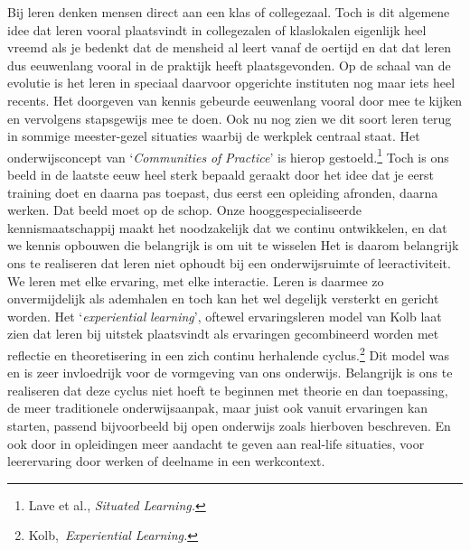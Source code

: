 \documentclass[smallauthor, chapterhaspagenum, nochapterinheader, pagenuminheader,  bigchapnum,medium2, tocpages, garamond, titleinheader]{jote-book}
\begin{document}
	Bij leren denken mensen direct aan een klas of collegezaal. Toch is dit algemene idee dat leren vooral plaatsvindt in collegezalen of klaslokalen eigenlijk heel vreemd als je bedenkt dat de mensheid al leert vanaf de oertijd en dat dat leren dus eeuwenlang vooral in de praktijk heeft plaatsgevonden. Op de schaal van de evolutie is het leren in speciaal daarvoor opgerichte instituten nog maar iets heel recents. Het doorgeven van kennis gebeurde eeuwenlang vooral door mee te kijken en vervolgens stapsgewijs mee te doen. Ook nu nog zien we dit soort leren terug in sommige meester-gezel situaties waarbij de werkplek centraal staat. Het onderwijsconcept van ‘\emph{Communities}\emph{ of }\emph{Practice}' is hierop gestoeld.\footnote{Lave et al.,\emph{ }\emph{Situated}\emph{ Learning}\emph{.}} Toch is ons beeld in de laatste eeuw heel sterk bepaald geraakt door het idee dat je eerst training doet en daarna pas toepast, dus eerst een opleiding afronden, daarna werken. Dat beeld moet op de schop. Onze hooggespecialiseerde kennismaatschappij maakt het noodzakelijk dat we continu ontwikkelen, en dat we kennis opbouwen die belangrijk is om uit te wisselen Het is daarom belangrijk ons te realiseren dat leren niet ophoudt bij een onderwijsruimte of leeractiviteit. We leren met elke ervaring, met elke interactie. Leren is daarmee zo onvermijdelijk als ademhalen en toch kan het wel degelijk versterkt en gericht worden. Het ‘\emph{experiential}\emph{ }\emph{learning}', oftewel ervaringsleren model van Kolb laat zien dat leren bij uitstek plaatsvindt als ervaringen gecombineerd worden met reflectie en theoretisering in een zich continu herhalende cyclus.\footnote{Kolb, \emph{Experiential}\emph{ }\emph{Learning.}} Dit model was en is zeer invloedrijk voor de vormgeving van ons onderwijs. Belangrijk is ons te realiseren dat deze cyclus niet hoeft te beginnen met theorie en dan toepassing, de meer traditionele onderwijsaanpak, maar juist ook vanuit ervaringen kan starten, passend bijvoorbeeld bij open onderwijs zoals hierboven beschreven. En ook door in opleidingen meer aandacht te geven aan real-life situaties, voor leerervaring door werken of deelname in een werkcontext.
\end{document}
